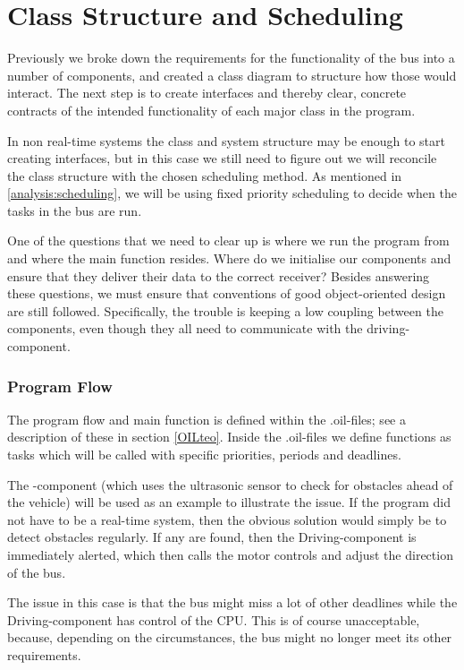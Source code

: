 \section{Class Structure and Scheduling}

Previously we broke down the requirements for the functionality of the bus into a number of components, and created a class diagram  to structure how those would interact. The next step is to create interfaces and thereby clear, concrete contracts of the intended functionality of each major class in the program. 

In non real-time systems the class and system structure may be enough to start creating interfaces, but in this case we still need to figure out we will reconcile the class structure with the chosen scheduling method. As mentioned in \ref{analysis:scheduling}, we will be using fixed priority scheduling to decide when the tasks in the bus are run. 

One of the questions that we need to clear up is where we run the program from and where the main function resides. Where do we initialise our components and ensure that they deliver their data to the correct receiver? Besides answering these questions, we must ensure that conventions of good object-oriented design are still followed. Specifically, the trouble is keeping a low coupling between the components, even though they all need to communicate with the driving-component. 

\subsubsection{Program Flow}
The program flow and main function is defined within the .oil-files; see a description of these in section \ref{OILteo}. Inside the .oil-files we define functions as tasks which will be called with specific priorities, periods and deadlines. 

The -component (which uses the ultrasonic sensor to check for obstacles ahead of the vehicle) will be used as an example to illustrate the issue. If the program did not have to be a real-time system, then the obvious solution would simply be to detect obstacles regularly. If any are found, then the Driving-component is immediately alerted, which then calls the motor controls and adjust the direction of the bus.

The issue in this case is that the bus might miss a lot of other deadlines while the Driving-component has control of the CPU. This is of course unacceptable, because, depending on the circumstances, the bus might no longer meet its other requirements. 


